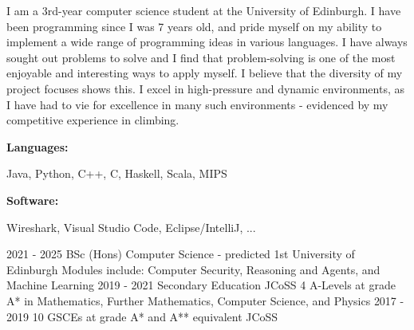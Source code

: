 \documentclass[9pt]{developercv} %
\begin{document}
\begin{minipage}[t]{0.56\textwidth}
	\vspace{-6pt}
 
	I am a 3rd-year computer science student at the University of Edinburgh. 
	I have been programming since I was 7 years old, and pride myself on my ability to implement a wide range of programming ideas in various languages. 
	I have always sought out problems to solve and I find that problem-solving is one of the most enjoyable and interesting ways to apply myself. 
	I believe that the diversity of my project focuses shows this. 
	I excel in high-pressure and dynamic environments, as I have had to vie for excellence in many such environments - evidenced by my competitive experience in climbing.\\
\end{minipage}
\hfill %
\begin{minipage}[t]{0.365\textwidth}
    \vspace{-6pt}
    
    \begin{minipage}[t]{0.15\textwidth}
        \textbf{Languages:}
    \end{minipage}
    \hfill
    \begin{minipage}[t]{0.68\textwidth}
      Java, Python, C++, C, Haskell, Scala, MIPS
    \end{minipage}
    \vspace{4mm}
    
    \begin{minipage}[t]{0.15\textwidth}
        \textbf{Software:}
    \end{minipage}
    \hfill
    \begin{minipage}[t]{0.68\textwidth}
      Wireshark, Visual Studio Code, Eclipse/IntelliJ, ...
    \end{minipage}
    
\end{minipage}


\vspace{-10 pt}
\begin{entrylist}
    \entry
		{2021 - 2025}
		{BSc (Hons) Computer Science - predicted 1st}
		{University of Edinburgh}
		{Modules include: Computer Security, Reasoning and Agents, and Machine Learning}
    \entry
		{2019 - 2021}
		{Secondary Education}
		{JCoSS}
		{4 A-Levels at grade A* in Mathematics, Further Mathematics, Computer Science, and Physics}
	\entry
		{2017 - 2019}
		{10 GSCEs at grade A* and A** equivalent}
		{JCoSS}
		{ }
\end{entrylist}
\end{document}
